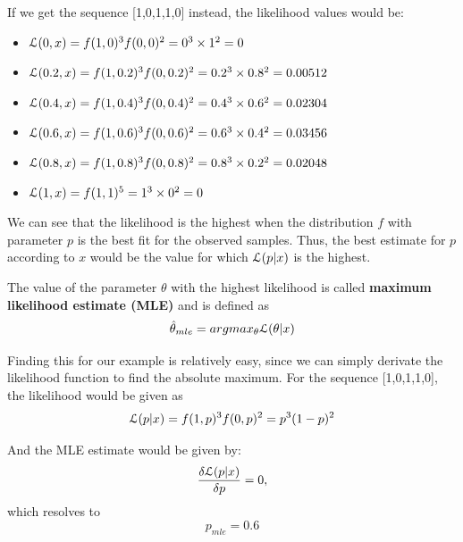 If we get the sequence [1,0,1,1,0] instead, the likelihood values would be:
\begin{itemize}
\item $\mathcal{L}(0,x) = f(1,0)^3f(0,0)^2 = 0^3\times 1^2 = 0$
\item $\mathcal{L}(0.2,x) = f(1,0.2)^3f(0,0.2)^2 = 0.2^3\times 0.8^2 = 0.00512$
\item $\mathcal{L}(0.4,x) = f(1,0.4)^3f(0,0.4)^2 = 0.4^3\times 0.6^2 = 0.02304$
\item $\mathcal{L}(0.6,x) = f(1,0.6)^3f(0,0.6)^2 = 0.6^3\times 0.4^2 = 0.03456$
\item $\mathcal{L}(0.8,x) = f(1,0.8)^3f(0,0.8)^2 = 0.8^3\times 0.2^2 = 0.02048$
\item $\mathcal{L}(1,x) = f(1,1)^5 = 1^3\times 0^2 = 0$
\end{itemize}

We can see that the likelihood is the highest when the distribution $f$ with parameter $p$ is the best fit for the observed samples. Thus, the best estimate for $p$ according to $x$ would be the value for which $\mathcal{L}(p|x)$ is the highest. 

The value of the parameter $\theta$ with the highest likelihood is called {\bf maximum likelihood estimate (MLE)} and is defined as
\begin{equation*}
\hat{\theta}_{mle}=argmax_{\theta}\mathcal{L}(\theta|x)
\end{equation*}

Finding this for our example is relatively easy, since we can simply derivate the likelihood function to find the absolute maximum. For the sequence [1,0,1,1,0], the likelihood would be given as
\begin{equation*}
\mathcal{L}(p|x) = f(1,p)^3f(0,p)^2 = p^3(1-p)^2
\end{equation*}

And the MLE estimate would be given by:
\begin{equation*}
\frac{\delta \mathcal{L}(p|x)}{\delta p}=0,
\end{equation*}
which resolves to
\begin{equation*}
p_{mle}=0.6
\end{equation*}

